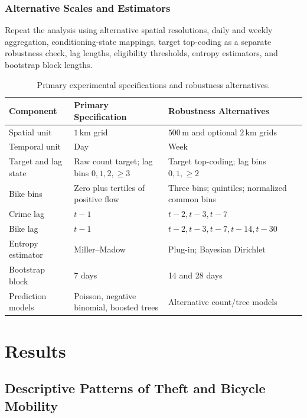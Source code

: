 \documentclass[applsci,article,submit,moreauthors]{Definitions/mdpi}
\begin{document}
\subsubsection{Alternative Scales and Estimators}
Repeat the analysis using alternative spatial resolutions, daily and weekly
aggregation, conditioning-state mappings, target top-coding as a separate
robustness check, lag lengths, eligibility thresholds, entropy estimators,
and bootstrap block lengths.

\begin{table}[H]
\caption{Primary experimental specifications and robustness alternatives.}
\label{tab:experimental_specifications}
\begin{tabularx}{\textwidth}{lXX}
\toprule
\textbf{Component} & \textbf{Primary Specification} & \textbf{Robustness Alternatives}\\
\midrule
Spatial unit & $1\,\mathrm{km}$ grid & $500\,\mathrm{m}$ and optional $2\,\mathrm{km}$ grids\\
Temporal unit & Day & Week\\
Target and lag state & Raw count target; lag bins \(0,1,2,\geq3\) & Target top-coding; lag bins \(0,1,\geq2\)\\
Bike bins & Zero plus tertiles of positive flow & Three bins; quintiles; normalized common bins\\
Crime lag & $t-1$ & $t-2,t-3,t-7$\\
Bike lag & $t-1$ & $t-2,t-3,t-7,t-14,t-30$\\
Entropy estimator & Miller--Madow & Plug-in; Bayesian Dirichlet\\
Bootstrap block & 7 days & 14 and 28 days\\
Prediction models & Poisson, negative binomial, boosted trees & Alternative count/tree models\\
\bottomrule
\end{tabularx}
\end{table}

\section{Results}
\label{sec:results}


\subsection{Descriptive Patterns of Theft and Bicycle Mobility}
\label{subsec:results_descriptive}
\end{document}
